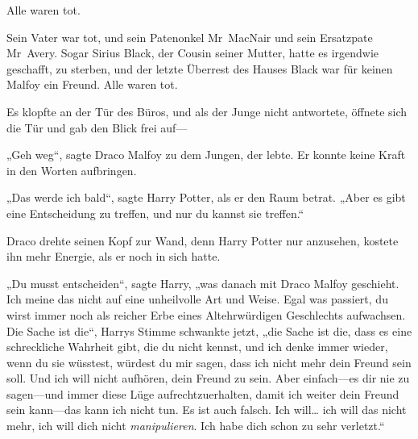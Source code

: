 Alle waren tot.

Sein Vater war tot, und sein Patenonkel Mr~MacNair und sein Ersatzpate Mr~Avery. Sogar Sirius Black, der Cousin seiner Mutter, hatte es irgendwie geschafft, zu sterben, und der letzte Überrest des Hauses Black war für keinen Malfoy ein Freund. Alle waren tot.

Es klopfte an der Tür des Büros, und als der Junge nicht antwortete, öffnete sich die Tür und gab den Blick frei auf—

„Geh weg“, sagte Draco Malfoy zu dem Jungen, der lebte. Er konnte keine Kraft in den Worten aufbringen.

„Das werde ich bald“, sagte Harry Potter, als er den Raum betrat. „Aber es gibt eine Entscheidung zu treffen, und nur du kannst sie treffen.“

Draco drehte seinen Kopf zur Wand, denn Harry Potter nur anzusehen, kostete ihn mehr Energie, als er noch in sich hatte.

„Du musst entscheiden“, sagte Harry, „was danach mit Draco Malfoy geschieht. Ich meine das nicht auf eine unheilvolle Art und Weise. Egal was passiert, du wirst immer noch als reicher Erbe eines Altehrwürdigen Geschlechts aufwachsen. Die Sache ist die“, Harrys Stimme schwankte jetzt, „die Sache ist die, dass es eine schreckliche Wahrheit gibt, die du nicht kennst, und ich denke immer wieder, wenn du sie wüsstest, würdest du mir sagen, dass ich nicht mehr dein Freund sein soll. Und ich will nicht aufhören, dein Freund zu sein. Aber einfach—es dir nie zu sagen—und immer diese Lüge aufrechtzuerhalten, damit ich weiter dein Freund sein kann—das kann ich nicht tun. Es ist auch falsch. Ich will… ich will das nicht mehr, ich will dich nicht \emph{manipulieren}. Ich habe dich schon zu sehr verletzt.“

